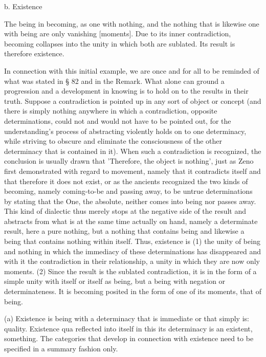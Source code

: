 b. Existence

The being in becoming,
as one with nothing,
and the nothing that is
likewise one with being
are only vanishing [moments].
Due to its inner contradiction,
becoming collapses into the unity
in which both are sublated.
Its result is therefore existence.

    In connection with this initial example,
    we are once and for all to be reminded
    of what was stated in § 82 and in the Remark.
    What alone can ground a progression
    and a development in knowing is
    to hold on to the results in their truth.
    Suppose a contradiction is pointed up
    in any sort of object or concept
    (and there is simply nothing anywhere
    in which a contradiction, opposite determinations,
    could not and would not have to be pointed out,
    for the understanding's process of abstracting
    violently holds on to one determinacy,
    while striving to obscure and eliminate
    the consciousness of the other determinacy
    that is contained in it).
    When such a contradiction is recognized,
    the conclusion is usually drawn that
    'Therefore, the object is nothing',
    just as Zeno first demonstrated with regard to movement,
    namely that it contradicts itself
    and that therefore it does not exist,
    or as the ancients recognized the two kinds of becoming,
    namely coming-to-be and passing away,
    to be untrue determinations by stating that the One,
    the absolute, neither comes into being nor passes away.
    This kind of dialectic thus merely stops
    at the negative side of the result
    and abstracts from what is at the same time
    actually on hand, namely a determinate result,
    here a pure nothing, but a nothing that contains being
    and likewise a being that contains nothing within itself.
    Thus, existence is
    (1) the unity of being and nothing
    in which the immediacy of these determinations has disappeared
    and with it the contradiction in their relationship,
    a unity in which they are now only moments.
    (2) Since the result is the sublated contradiction,
    it is in the form of a simple unity with itself
    or itself as being, but a being with negation or determinateness.
    It is becoming posited in the form of one of its moments,
    that of being.

(a) Existence is being with a determinacy
that is immediate or that simply is: quality.
Existence qua reflected into itself
in this its determinacy is an existent, something.
The categories that develop in connection with existence
need to be specified in a summary fashion only.

